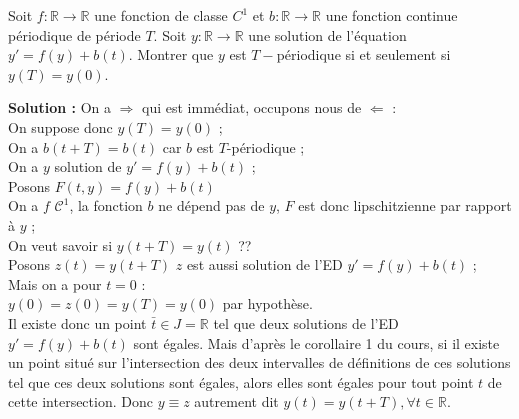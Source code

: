 \documentclass[12pt,a4paper]{article}
\newcommand{\R}{\mathbb{R}}
\newcommand{\solution}[1]{\par\noindent\textbf{\color{OliveGreen}Solution :} \textcolor{OliveGreen}{#1}}
\begin{document}
\begin{exo}
Soit $f:\R\longrightarrow\R$ une fonction de classe $C^1$ et $b:\R\longrightarrow\R$ une fonction continue périodique de période $T$. Soit $y:\R\longrightarrow\R$ une solution de l'équation $y'=f(y)+b(t)$. Montrer que $y$ est $T-$périodique si et seulement si $y(T)=y(0)$.
	\solution{On a $\Rightarrow$ qui est immédiat, occupons nous de $\Leftarrow$ :\\
	On suppose donc $y(T) = y(0)$ ;\\
	On a $b(t+T) = b(t)$ car $b$ est $T$-périodique ;\\
	On a $y$ solution de $y' = f(y)+b(t)$ ; \\
	Posons $F(t,y) = f(y) + b(t)$\\
	On a $f$ $\mathcal{C}^1$, la fonction $b$ ne dépend pas de $y$, $F$ est donc lipschitzienne par rapport à $y$ ;\\
	On veut savoir si $y(t+T) = y(t)$ ??\\
	Posons $z(t) = y(t+T)$ $z$ est aussi solution de l'ED $y' = f(y) + b(t)$ ;\\
	Mais on a pour $t = 0$ : \\
	$y(0) = z(0) = y(T) = y(0)$ par hypothèse.\\
	Il existe donc un point $\bar{t} \in J = \R$ tel que deux solutions de l'ED $y' = f(y) + b(t)$ sont égales. Mais d'après le corollaire 1 du cours, si il existe un point situé sur l'intersection des deux intervalles de définitions de ces solutions tel que ces deux solutions sont égales, alors elles sont égales pour tout point $t$ de cette intersection. Donc $y\equiv z$ autrement dit $y(t) = y(t+T), \forall t \in \R$.
	}
\end{exo}

\end{document}

